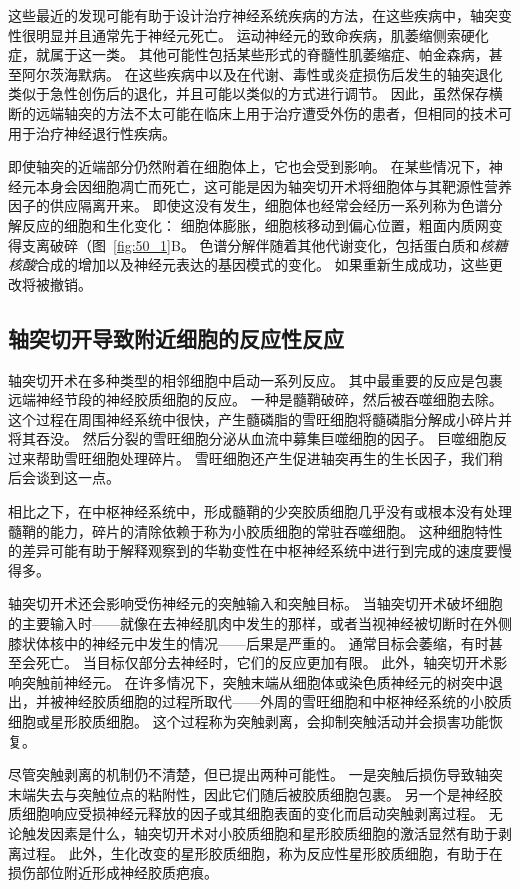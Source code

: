 这些最近的发现可能有助于设计治疗神经系统疾病的方法，在这些疾病中，轴突变性很明显并且通常先于神经元死亡。
运动神经元的致命疾病，肌萎缩侧索硬化症，就属于这一类。
其他可能性包括某些形式的脊髓性肌萎缩症、帕金森病，甚至阿尔茨海默病。
在这些疾病中以及在代谢、毒性或炎症损伤后发生的轴突退化类似于急性创伤后的退化，并且可能以类似的方式进行调节。
因此，虽然保存横断的远端轴突的方法不太可能在临床上用于治疗遭受外伤的患者，但相同的技术可用于治疗神经退行性疾病。


即使轴突的近端部分仍然附着在细胞体上，它也会受到影响。
在某些情况下，神经元本身会因细胞凋亡而死亡，这可能是因为轴突切开术将细胞体与其靶源性营养因子的供应隔离开来。
即使这没有发生，细胞体也经常会经历一系列称为色谱分解反应的细胞和生化变化：
细胞体膨胀，细胞核移动到偏心位置，粗面内质网变得支离破碎（图~\ref{fig:50_1}B。
色谱分解伴随着其他代谢变化，包括蛋白质和\textit{核糖核酸}合成的增加以及神经元表达的基因模式的变化。
如果重新生成成功，这些更改将被撤销。



\subsection{轴突切开导致附近细胞的反应性反应}

轴突切开术在多种类型的相邻细胞中启动一系列反应。
其中最重要的反应是包裹远端神经节段的神经胶质细胞的反应。
一种是髓鞘破碎，然后被吞噬细胞去除。
这个过程在周围神经系统中很快，产生髓磷脂的雪旺细胞将髓磷脂分解成小碎片并将其吞没。
然后分裂的雪旺细胞分泌从血流中募集巨噬细胞的因子。
巨噬细胞反过来帮助雪旺细胞处理碎片。
雪旺细胞还产生促进轴突再生的生长因子，我们稍后会谈到这一点。


相比之下，在中枢神经系统中，形成髓鞘的少突胶质细胞几乎没有或根本没有处理髓鞘的能力，碎片的清除依赖于称为小胶质细胞的常驻吞噬细胞。
这种细胞特性的差异可能有助于解释观察到的华勒变性在中枢神经系统中进行到完成的速度要慢得多。


轴突切开术还会影响受伤神经元的突触输入和突触目标。
当轴突切开术破坏细胞的主要输入时——就像在去神经肌肉中发生的那样，或者当视神经被切断时在外侧膝状体核中的神经元中发生的情况——后果是严重的。
通常目标会萎缩，有时甚至会死亡。
当目标仅部分去神经时，它们的反应更加有限。
此外，轴突切开术影响突触前神经元。
在许多情况下，突触末端从细胞体或染色质神经元的树突中退出，并被神经胶质细胞的过程所取代——外周的雪旺细胞和中枢神经系统的小胶质细胞或星形胶质细胞。
这个过程称为突触剥离，会抑制突触活动并会损害功能恢复。


尽管突触剥离的机制仍不清楚，但已提出两种可能性。
一是突触后损伤导致轴突末端失去与突触位点的粘附性，因此它们随后被胶质细胞包裹。
另一个是神经胶质细胞响应受损神经元释放的因子或其细胞表面的变化而启动突触剥离过程。
无论触发因素是什么，轴突切开术对小胶质细胞和星形胶质细胞的激活显然有助于剥离过程。
此外，生化改变的星形胶质细胞，称为反应性星形胶质细胞，有助于在损伤部位附近形成神经胶质疤痕。


